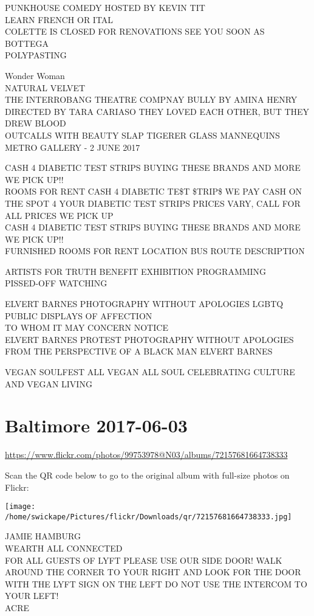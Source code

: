 \documentclass[10pt,letterpaper]{article}
\begin{document}
PUNKHOUSE COMEDY HOSTED BY KEVIN TIT\\
LEARN FRENCH OR ITAL\\
COLETTE IS CLOSED FOR RENOVATIONS SEE YOU SOON AS BOTTEGA\\
POLYPASTING

Wonder Woman\\
NATURAL VELVET\\
THE INTERROBANG THEATRE COMPNAY BULLY BY AMINA HENRY DIRECTED BY TARA CARIASO THEY LOVED EACH OTHER, BUT THEY DREW BLOOD\\
OUTCALLS WITH BEAUTY SLAP TIGERER GLASS MANNEQUINS METRO GALLERY {-} 2 JUNE 2017

CASH 4 DIABETIC TEST STRIPS BUYING THESE BRANDS AND MORE WE PICK UP!!\\
ROOMS FOR RENT CASH 4 DIABETIC TE\$T \$TRIP\$ WE PAY CASH ON THE SPOT 4 YOUR DIABETIC TEST STRIPS PRICES VARY, CALL FOR ALL PRICES WE PICK UP\\
CASH 4 DIABETIC TEST STRIPS BUYING THESE BRANDS AND MORE WE PICK UP!!\\
FURNISHED ROOMS FOR RENT LOCATION BUS ROUTE DESCRIPTION

ARTISTS FOR TRUTH BENEFIT EXHIBITION PROGRAMMING\\
PISSED{-}OFF WATCHING

ELVERT BARNES PHOTOGRAPHY WITHOUT APOLOGIES LGBTQ PUBLIC DISPLAYS OF AFFECTION\\
TO WHOM IT MAY CONCERN NOTICE\\
ELVERT BARNES PROTEST PHOTOGRAPHY WITHOUT APOLOGIES FROM THE PERSPECTIVE OF A BLACK MAN ELVERT BARNES

VEGAN SOULFEST ALL VEGAN ALL SOUL CELEBRATING CULTURE AND VEGAN LIVING


\section*{Baltimore 2017-06-03}

\url{https://www.flickr.com/photos/99753978@N03/albums/72157681664738333}

Scan the QR code below to go to the original album with full-size photos on Flickr:

\texttt{[image: /home/swickape/Pictures/flickr/Downloads/qr/72157681664738333.jpg]}


JAMIE HAMBURG\\
WEARTH ALL CONNECTED\\
FOR ALL GUESTS OF LYFT PLEASE USE OUR SIDE DOOR!  WALK AROUND THE CORNER TO YOUR RIGHT AND LOOK FOR THE DOOR WITH THE LYFT SIGN ON THE LEFT DO NOT USE THE INTERCOM TO YOUR LEFT!\\
ACRE
\end{document}
